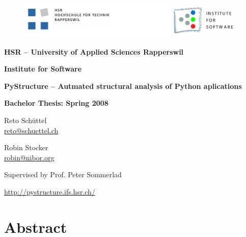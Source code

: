 \documentclass[12pt,halfparskip]{scrreprt}
\begin{document}
\begin{titlepage}
\begin{center}
\thispagestyle{empty}

\begin{figure}[h]
 \centering
 \vspace{0,5cm}
 \includegraphics[width=\textwidth]{img/hsr_logo}
\end{figure}

\vspace{1cm}
{\Large \bfseries HSR -- University of Applied Sciences Rapperswil}

\vspace{0,5cm}
{\Large \bfseries Institute for Software}

\vspace{2cm}
{\Huge \bfseries PyStructure -- Autmated structural analysis of Python aplications}
\vspace{2cm}

{\Large \bfseries Bachelor Thesis: Spring 2008}

\vspace{0,5cm}
\SVNDate


\vspace{1cm}
Reto Schüttel \\ \url{reto@schuettel.ch}

\vspace{0,5cm}
Robin Stocker \\ \url{robin@nibor.org}

\vspace{0,5cm}
Supervised by Prof. Peter Sommerlad


\vspace{1cm}
\url{http://pystructure.ifs.hsr.ch/}

\end{center}
\end{titlepage}


\pagestyle{plain}

\chapter*{Abstract}
\end{document}
